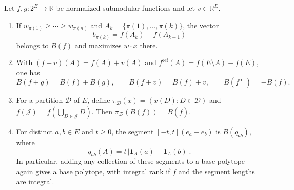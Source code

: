 \begin{lemma}\label{lem:base-calculus}
Let $f,g:2^E\to\mathbb R$ be normalized submodular functions and let
$v\in\mathbb R^E$.
\begin{enumerate}
 \item If $w_{\pi(1)}\geq\cdots\geq w_{\pi(n)}$ and
 $A_k=\{\pi(1),\ldots,\pi(k)\}$, the vector
 \[
 b_{\pi(k)}=f(A_k)-f(A_{k-1})
 \]
 belongs to $B(f)$ and maximizes $w\cdot x$ there.
 \item With $(f+v)(A)=f(A)+v(A)$ and
 $f^{\mathrm{ref}}(A)=f(E\setminus A)-f(E)$, one has
 \[
 B(f+g)=B(f)+B(g),\qquad B(f+v)=B(f)+v,\qquad
 B(f^{\mathrm{ref}})=-B(f).
 \]
 \item For a partition $\mathcal D$ of $E$, define
 $\pi_{\mathcal D}(x)=(x(D):D\in\mathcal D)$ and
 $\bar f(\mathcal J)=f(\bigcup_{D\in\mathcal J}D)$.
 Then $\pi_{\mathcal D}(B(f))=B(\bar f)$.
 \item For distinct $a,b\in E$ and $t\geq0$, the segment
 $[-t,t](e_a-e_b)$ is $B(q_{ab})$, where
 \[
 q_{ab}(A)=t\,|\mathbf1_A(a)-\mathbf1_A(b)|.
 \]
 In particular, adding any collection of these segments to a base
 polytope again gives a base polytope, with integral rank if $f$ and
 the segment lengths are integral.
\end{enumerate}
\end{lemma}

